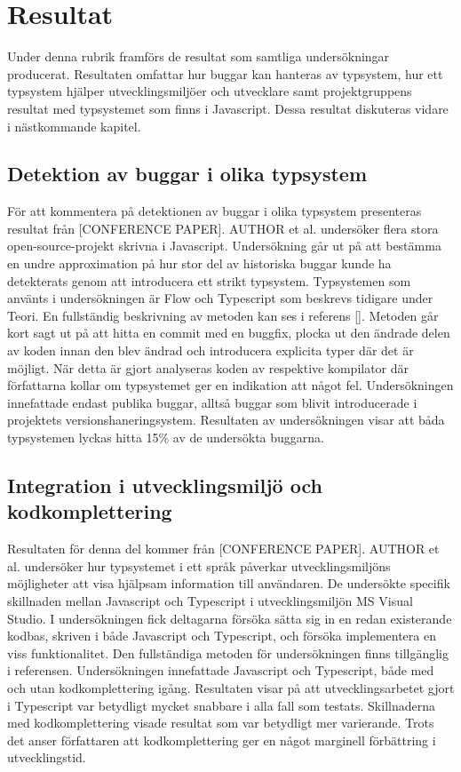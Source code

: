 \section{Resultat}
\label{sec:alexander-results}

Under denna rubrik framförs de resultat som samtliga undersökningar producerat. Resultaten omfattar hur buggar kan hanteras av typsystem, hur ett typsystem hjälper utvecklingsmiljöer och utvecklare samt projektgruppens resultat med typsystemet som finns i Javascript. Dessa resultat diskuteras vidare i nästkommande kapitel.

\subsection{Detektion av buggar i olika typsystem}
För att kommentera på detektionen av buggar i olika typsystem presenteras resultat från [CONFERENCE PAPER]. AUTHOR et al. undersöker flera stora open-source-projekt skrivna i Javascript.  Undersökning går ut på att bestämma en undre approximation på hur stor del av historiska buggar kunde ha detekterats genom att introducera ett strikt typsystem. Typsystemen som använts i undersökningen är Flow och Typescript som beskrevs tidigare under Teori. En fullständig beskrivning av metoden kan ses i referens []. Metoden går kort sagt ut på att hitta en commit med en buggfix, plocka ut den ändrade delen av koden innan den blev ändrad och introducera explicita typer där det är möjligt. När detta är gjort analyseras koden av respektive kompilator där författarna kollar om typsystemet ger en indikation att något fel. Undersökningen innefattade endast publika buggar, alltså buggar som blivit introducerade i projektets versionshaneringsystem. Resultaten av undersökningen visar att båda typsystemen lyckas hitta 15\% av de undersökta buggarna. 

\subsection{Integration i utvecklingsmiljö och kodkomplettering}
Resultaten för denna del kommer från [CONFERENCE PAPER]. AUTHOR et al. undersöker hur typsystemet i ett språk påverkar utvecklingsmiljöns möjligheter att visa hjälpsam information till användaren. De undersökte specifik skillnaden mellan Javascript och Typescript i utvecklingsmiljön MS Visual Studio. I undersökningen fick deltagarna försöka sätta sig in en redan existerande kodbas, skriven i både Javascript och Typescript, och försöka implementera en viss funktionalitet. Den fullständiga metoden för undersökningen finns tillgänglig i referensen. Undersökningen innefattade Javascript och Typescript, både med och utan kodkomplettering igång. Resultaten visar på att utvecklingsarbetet gjort i Typescript var betydligt mycket snabbare i alla fall som testats. Skillnaderna med kodkomplettering visade resultat som var betydligt mer varierande. Trots det anser författaren att kodkomplettering ger en något marginell förbättring i utvecklingstid.

